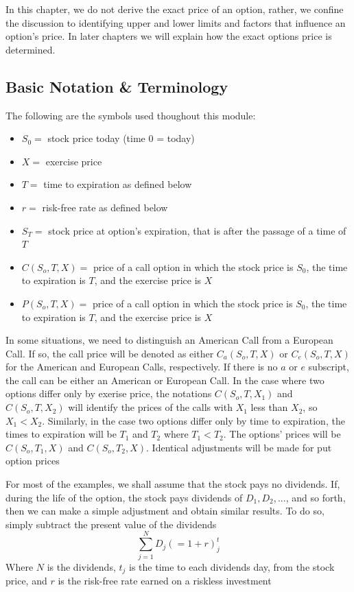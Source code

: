 \documentclass{book}
\theoremstyle{definition}
\theoremstyle{remark}
\begin{document}
In this chapter, we do not derive the exact price of an option, rather, we confine the discussion to identifying upper and lower limits and factors that influence an option's price. In later chapters we will explain how the exact options price is determined.  
   
    \subsection{Basic Notation \& Terminology}
        The following are the symbols used thoughout this module:
            \begin{itemize}
                \item $S_0 =$ stock price today (time 0 = today)
                \item $X =$ exercise price
                \item $T =$ time to expiration as defined below
                \item $r =$ risk-free rate as defined below
                \item $S_T =$ stock price at option's expiration, that is after the passage of a time of $T$
                \item $C(S_o, T, X) =$ price of a call option in which the stock price is $S_0$, the time to expiration is $T$, and the exercise price is $X$
                \item $P(S_o, T, X) =$ price of a call option in which the stock price is $S_0$, the time to expiration is $T$, and the exercise price is $X$
            \end{itemize}
        In some situations, we need to distinguish an American Call from a European Call. If so, the call price will be denoted as either $C_a(S_o, T, X)$ or $C_e(S_o, T, X)$ for the American and European Calls, respectively. If there is no $a$ or $e$ subscript, the call can be either an American or European Call. In the case where two options differ only by exerise price, the notations $C(S_o, T, X_1)$ and $C(S_o, T, X_2)$ will identify the prices of the calls with $X_1$ less than $X_2$, so $X_1 < X_2$. Similarly, in the case two options differ only by time to expiration, the times to expiration will be $T_1$ and $T_2$ where $T_1<T_2$. The options' prices will be $C(S_o, T_1, X)$ and $C(S_o, T_2, X)$. Identical adjustments will be made for put option prices
        
        For most of the examples, we shall assume that the stock pays no dividends. If, during the life of the option, the stock pays dividends of $D_1, D_2, ... $, and so forth, then  we can make a simple adjustment and obtain similar results. To do so, simply subtract the present value of the dividends
            \begin{equation}
                \sum_{j=1}^{N} D_j( = 1+r)^t_j
            \end{equation}
        Where $N$ is the dividends, $t_j$ is the time to each dividends day, from the stock price, and $r$ is the risk-free rate earned on a riskless investment
        
\end{document}
